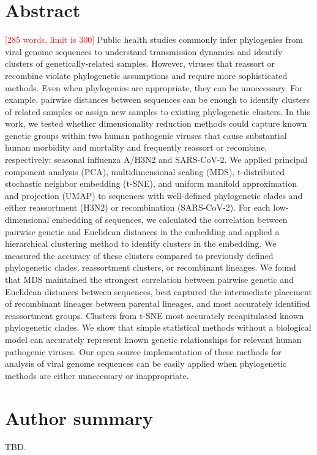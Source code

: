 \documentclass[10pt,letterpaper]{article}
\def\jhc#1{\textcolor{red}{[#1]}}
\begin{document}
\section*{Abstract}
\jhc{285 words, limit is 300}
Public health studies commonly infer phylogenies from viral genome sequences to understand transmission dynamics and identify clusters of genetically-related samples.
However, viruses that reassort or recombine violate phylogenetic assumptions and require more sophisticated methods.
Even when phylogenies are appropriate, they can be unnecessary.
For example, pairwise distances between sequences can be enough to identify clusters of related samples or assign new samples to existing phylogenetic clusters.
In this work, we tested whether dimensionality reduction methods could capture known genetic groups within two human pathogenic viruses that cause substantial human morbidity and mortality and frequently reassort or recombine, respectively: seasonal influenza A/H3N2 and SARS-CoV-2.
We applied principal component analysis (PCA), multidimensional scaling (MDS), t-distributed stochastic neighbor embedding (t-SNE), and uniform manifold approximation and projection (UMAP) to sequences with well-defined phylogenetic clades and either reassortment (H3N2) or recombination (SARS-CoV-2).
For each low-dimensional embedding of sequences, we calculated the correlation between pairwise genetic and Euclidean distances in the embedding and applied a hierarchical clustering method to identify clusters in the embedding.
We measured the accuracy of these clusters compared to previously defined phylogenetic clades, reassortment clusters, or recombinant lineages.
We found that MDS maintained the strongest correlation between pairwise genetic and Euclidean distances between sequences, best captured the intermediate placement of recombinant lineages between parental lineages, and most accurately identified reassortment groups.
Clusters from t-SNE most accurately recapitulated known phylogenetic clades.
We show that simple statistical methods without a biological model can accurately represent known genetic relationships for relevant human pathogenic viruses.
Our open source implementation of these methods for analysis of viral genome sequences can be easily applied when phylogenetic methods are either unnecessary or inappropriate.

\section*{Author summary}
TBD.
\end{document}
